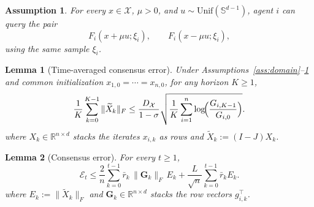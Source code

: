 \documentclass[10pt,a4paper]{amsart}
\newtheorem{assumption}{Assumption}
\newtheorem{lemma}{Lemma}
\begin{document}
\begin{assumption}
\label{ass:oracle}
For every $x \in \mathcal{X}$, $\mu > 0$, and $u \sim \mathrm{Unif}(\mathbb{S}^{d-1})$, agent $i$ can query the pair
\[
F_i(x+\mu u;\xi_i),
\qquad
F_i(x-\mu u;\xi_i),
\]
using the same sample $\xi_i$.
\end{assumption}

\begin{lemma}[Time-averaged consensus error]\label{lem:avg-consensus-A}
Under Assumptions~\ref{ass:domain}--\ref{ass:oracle} and common initialization
\(x_{1,0}=\cdots=x_{n,0}\), for any horizon \(K\ge 1\),
\[
\frac{1}{K}\sum_{k=0}^{K-1}\|\widetilde X_k\|_F
\le
\frac{D_{\mathcal{X}}}{1-\sigma}
\sqrt{\frac{1}{K}\sum_{i=1}^{n}\log\!\Bigl(\frac{G_{i,K-1}}{G_{i,0}}\Bigr)}.
\]
where \(X_k\in\mathbb R^{n\times d}\) stacks the iterates \(x_{i,k}\) as rows
and \(\widetilde X_k:=(I-J)X_k\).
\end{lemma}

\begin{lemma}[Consensus error]\label{lem:consensus-exp}
For every \(t\ge 1\),
\[
\mathcal E_t
\le
\frac{2}{n}\sum_{k=0}^{t-1}\bar r_k\,\|\mathbf G_k\|_F\,E_k
+
\frac{L}{\sqrt n}\sum_{k=0}^{t-1}\bar r_k E_k.
\]
where \(E_k:=\|\widetilde X_k\|_F\) and \(\mathbf G_k\in\mathbb R^{n\times d}\)
stacks the row vectors \(g_{i,k}^\top\).
\end{lemma}
\end{document}
